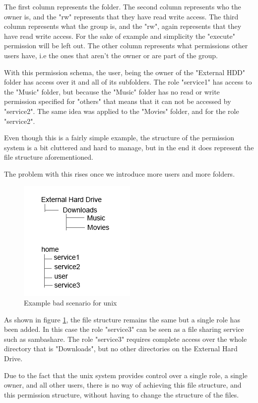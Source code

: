 The first column represents the folder. The second column represents who the owner is, and the "rw" represents that they have read write access. The third column represents what the group is, and the "rw", again represents that they have read write access. For the sake of example and simplicity the "execute" permission will be left out. The other column represents what permissions other users have, i.e the ones that aren't the owner or are part of the group.

With this permission schema, the user, being the owner of the "External HDD" folder has access over it and all of its subfolders. The role "service1" has access to the "Music" folder, but because the "Music" folder has no read or write permission specified for "others" that means that it can not be accessed by "service2". The same idea was applied to the "Movies" folder, and for the role "service2". 

Even though this is a fairly simple example, the structure of the permission system is a bit cluttered and hard to manage, but in the end it does represent the file structure aforementioned.

The problem with this rises once we introduce more users and more folders.

\begin{figure}[htbp]
	\centering
		\includegraphics[scale=0.75]{./figures/chapter2/unix_file_structure_2.png}
	\caption{Example bad scenario for unix}
	\label{FigUnixBadScenario2}
\end{figure}

As shown in figure \ref{FigUnixBadScenario2}, the file structure remains the same but a single role has been added. In this case the role "service3" can be seen as a file sharing service such as sambashare. The role "service3" requires complete access over the whole directory that is "Downloads", but no other directories on the External Hard Drive.

Due to the fact that the unix system provides control over a single role, a single owner, and all other users, there is no way of achieving this file structure, and this permission structure, without having to change the structure of the files.
